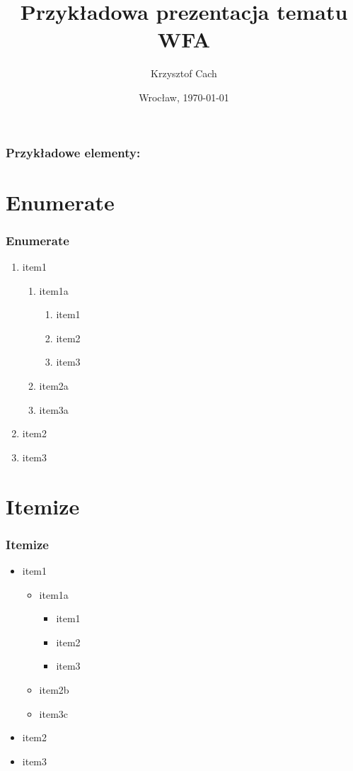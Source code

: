 \documentclass{beamer}
\title{Przykładowa prezentacja tematu WFA}
\author{Krzysztof Cach}
\institute{Instytut fizyki teoretycznej}
\date{Wrocław, \today}
\begin{document}
\begin{frame}
	\titlepage{}
\end{frame}

\begin{frame}
\frametitle{Przykładowe elementy:}
\tableofcontents
\end{frame}

\section{Enumerate}
\begin{frame}
	\frametitle{Enumerate}
	\begin{enumerate}
	\item item1
		\begin{enumerate}
		\item item1a
			\begin{enumerate}
				\item item1
				\item item2
					\item item3
			\end{enumerate}

		\item item2a
		\item item3a
	\end{enumerate}
	\item item2
	\item item3
	\end{enumerate}
\end{frame}

\section{Itemize}
\begin{frame}
	\frametitle{Itemize}
	\begin{itemize}
	\item item1
		\begin{itemize}
			\item item1a
			\begin{itemize}
				\item item1
				\item item2
				\item item3
			\end{itemize}
			\item item2b
			\item item3c
		\end{itemize}
	\item item2
	\item item3
	\end{itemize}
\end{frame}
\end{document}
